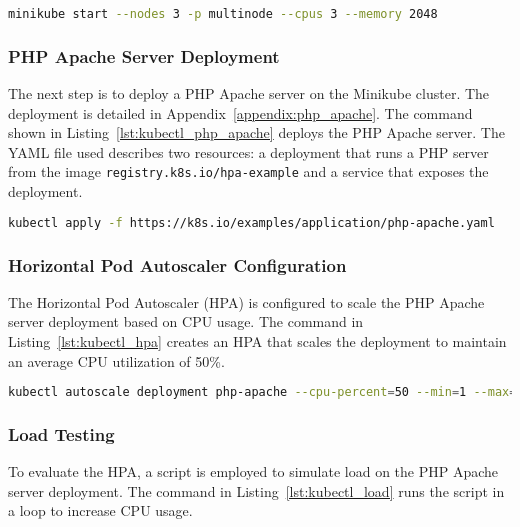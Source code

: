 \begin{lstlisting}[language=bash, label={lst:minikube-cluster},caption={Starting the Minikube cluster}]
  minikube start --nodes 3 -p multinode --cpus 3 --memory 2048
\end{lstlisting}

\subsubsection{PHP Apache Server Deployment}

The next step is to deploy a PHP Apache server on the Minikube cluster. The deployment is detailed in Appendix~\ref{appendix:php_apache}. The command shown in Listing~\ref{lst:kubectl_php_apache} deploys the PHP Apache server. The YAML file used describes two resources: a deployment that runs a PHP server from the image \texttt{registry.k8s.io/hpa-example} and a service that exposes the deployment.

\begin{lstlisting}[language=bash, label={lst:kubectl_php_apache},caption={Deploying the PHP Apache server}]
  kubectl apply -f https://k8s.io/examples/application/php-apache.yaml
\end{lstlisting}

\subsubsection{Horizontal Pod Autoscaler Configuration}

The Horizontal Pod Autoscaler (HPA) is configured to scale the PHP Apache server deployment based on CPU usage. The command in Listing~\ref{lst:kubectl_hpa} creates an HPA that scales the deployment to maintain an average CPU utilization of 50\%.

\begin{lstlisting}[language=bash, label={lst:kubectl_hpa},caption={Configuring the Horizontal Pod Autoscaler}]
  kubectl autoscale deployment php-apache --cpu-percent=50 --min=1 --max=10
\end{lstlisting}

\subsubsection{Load Testing}

To evaluate the HPA, a script is employed to simulate load on the PHP Apache server deployment. The command in Listing~\ref{lst:kubectl_load} runs the script in a loop to increase CPU usage.

